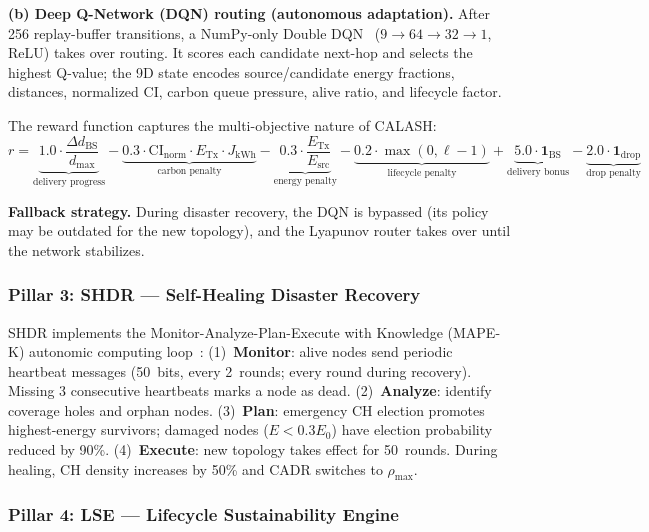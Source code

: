 \documentclass[12pt, onecolumn, journal]{IEEEtran}
\begin{document}
\textbf{(b) Deep Q-Network (DQN) routing (autonomous adaptation).}
After 256 replay-buffer transitions, a NumPy-only Double DQN~\cite{mnih2015dqn, vanhasselt2016ddqn} ($9 \to 64 \to 32 \to 1$, ReLU) takes over routing.
It scores each candidate next-hop and selects the highest Q-value; the 9D state encodes source/candidate energy fractions, distances, normalized CI, carbon queue pressure, alive ratio, and lifecycle factor.

The reward function captures the multi-objective nature of CALASH:
\begin{equation}
    r = \underbrace{1.0 \cdot \frac{\Delta d_{\text{BS}}}{d_{\max}}}_{\text{delivery progress}}
      - \underbrace{0.3 \cdot \text{CI}_{\text{norm}} \cdot E_{\text{Tx}} \cdot J_{\text{kWh}}}_{\text{carbon penalty}}
      - \underbrace{0.3 \cdot \frac{E_{\text{Tx}}}{E_{\text{src}}}}_{\text{energy penalty}}
      - \underbrace{0.2 \cdot \max(0, \ell - 1)}_{\text{lifecycle penalty}}
      + \underbrace{5.0 \cdot \mathbf{1}_{\text{BS}}}_{\text{delivery bonus}}
      - \underbrace{2.0 \cdot \mathbf{1}_{\text{drop}}}_{\text{drop penalty}}
    \label{eq:reward}
\end{equation}

\textbf{Fallback strategy.}
During disaster recovery, the DQN is bypassed (its policy may be outdated for the new topology), and the Lyapunov router takes over until the network stabilizes.

\subsubsection{Pillar 3: SHDR --- Self-Healing Disaster Recovery}
\label{sec:shdr}

SHDR implements the Monitor-Analyze-Plan-Execute with Knowledge (MAPE-K) autonomic computing loop~\cite{kephart2003autonomic}:
(1)~\textbf{Monitor}: alive nodes send periodic heartbeat messages (50~bits, every 2~rounds; every round during recovery). Missing 3 consecutive heartbeats marks a node as dead.
(2)~\textbf{Analyze}: identify coverage holes and orphan nodes.
(3)~\textbf{Plan}: emergency CH election promotes highest-energy survivors; damaged nodes ($E < 0.3 E_0$) have election probability reduced by 90\%.
(4)~\textbf{Execute}: new topology takes effect for 50~rounds.
During healing, CH density increases by 50\% and CADR switches to $\rho_{\max}$.

\subsubsection{Pillar 4: LSE --- Lifecycle Sustainability Engine}
\label{sec:lse}
\end{document}
